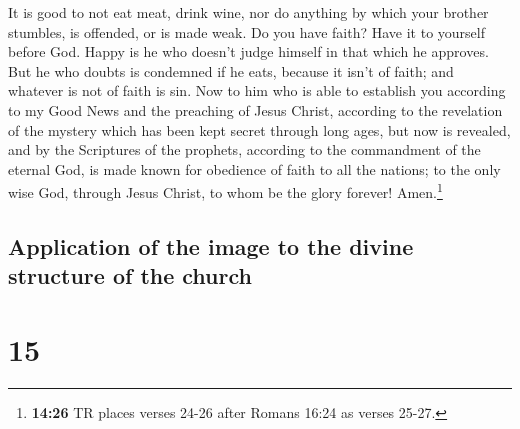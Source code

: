  It is good to not eat meat, drink wine, nor do anything
by which your brother stumbles, is offended, or is made weak.
 Do you have faith? Have it to yourself before God. Happy
is he who doesn't judge himself in that which he approves.
 But he who doubts is condemned if he eats, because it
isn't of faith; and whatever is not of faith is sin.  Now
to him who is able to establish you according to my Good News and the
preaching of Jesus Christ, according to the revelation of the mystery
which has been kept secret through long ages,  but now is
revealed, and by the Scriptures of the prophets, according to the
commandment of the eternal God, is made known for obedience of faith to
all the nations;  to the only wise God, through Jesus
Christ, to whom be the glory forever! Amen.\footnote{\textbf{14:26} TR
  places verses 24-26 after Romans 16:24 as verses 25-27.}

\hypertarget{application-of-the-image-to-the-divine-structure-of-the-church}{%
\subsection{Application of the image to the divine structure of the
church}\label{application-of-the-image-to-the-divine-structure-of-the-church}}

\hypertarget{section-14}{%
\section{15}\label{section-14}}

